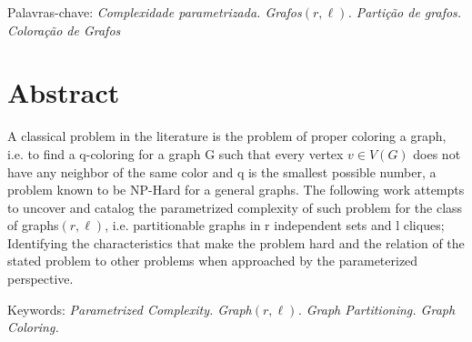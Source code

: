 \documentclass[a4paper,oneside,12pt]{book}
\begin{document}
\bigskip
%

\noindent Palavras-chave: \textit{Complexidade parametrizada. Grafos$(r,\ell)$. Partição de grafos. Coloração de Grafos}


\chapter*{Abstract}

\thispagestyle{myheadings}
\nocite{*}

A classical problem in the literature is the problem of proper coloring a graph, i.e. to find a q-coloring for a graph G such that every vertex $ v \in V (G) $ does not have any neighbor of the same color and q is the smallest possible number, a problem known to be NP-Hard for a general graphs. The following work attempts to uncover and catalog the parametrized complexity of such problem for the class of graphs$(r, \ell)$, i.e. partitionable graphs in r independent sets and l cliques; Identifying the characteristics that make the problem hard and the relation of the stated problem to other problems when approached by the parameterized perspective.

\bigskip
%

\noindent Keywords: \textit{Parametrized Complexity. Graph$(r,\ell)$. Graph Partitioning. Graph Coloring. }


\tableofcontents

\thispagestyle{myheadings}



\listoffigures
{}

\thispagestyle{myheadings}


\listoftables
{}
\end{document}

